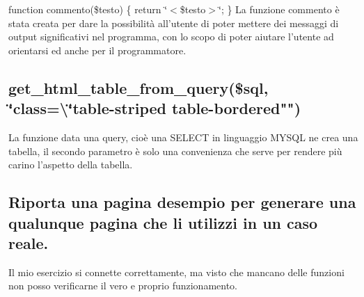 function commento(\$testo) \{ return \char`\"{}$<$\$testo$>$\char`\"{}; \} La funzione commento è stata creata per dare la possibilità all’utente di poter mettere dei messaggi di output significativi nel programma, con lo scopo di poter aiutare l’utente ad orientarsi ed anche per il programmatore. \subsection*{get\+\_\+html\+\_\+table\+\_\+from\+\_\+query(\$sql, \char`\"{}class=\textbackslash{}\char`\"{}table-\/striped table-\/bordered"")}

La funzione data una query, cioè una S\+E\+L\+E\+CT in linguaggio M\+Y\+S\+QL ne crea una tabella, il secondo parametro è solo una convenienza che serve per rendere più carino l’aspetto della tabella. \subsection*{Riporta una pagina d\textquotesingle{}esempio per generare una qualunque pagina che li utilizzi in un caso reale.}

Il mio esercizio si connette correttamente, ma visto che mancano delle funzioni non posso verificarne il vero e proprio funzionamento. 